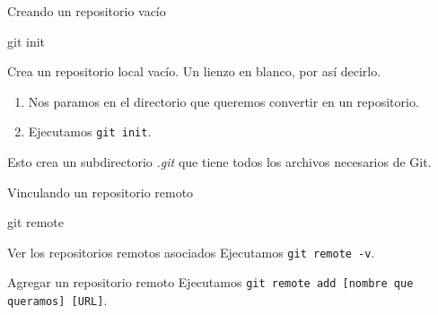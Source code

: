 \begin{frame}[t]{Creando un repositorio vacío}
    \begin{comando}
        git init
    \end{comando}

    \pause
    \begin{block}{}
        Crea un repositorio local vacío. Un lienzo en blanco, por así decirlo.
        \begin{enumerate}
            \item Nos paramos en el directorio que queremos convertir en un repositorio.
            \item Ejecutamos \texttt{git init}.
        \end{enumerate}
        Esto crea un subdirectorio \textit{.git} que tiene todos los archivos necesarios de Git.
    \end{block}
\end{frame}

\begin{frame}[t]{Vinculando un repositorio remoto}
    \begin{comando}
        git remote
    \end{comando}

    \vspace{0.5em}
    \pause
    \begin{block}{Ver los repositorios remotos asociados}
        Ejecutamos \texttt{git remote -v}.
    \end{block}

    \pause
    \begin{block}{Agregar un repositorio remoto}
        Ejecutamos \texttt{git remote add [nombre que queramos] [URL]}.
    \end{block}
\end{frame}

